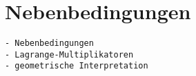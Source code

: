 %
%
%
\section{Nebenbedingungen
\label{buch:fuvar:section:kritisch}}

\begin{verbatim}
- Nebenbedingungen
- Lagrange-Multiplikatoren
- geometrische Interpretation
\end{verbatim}
